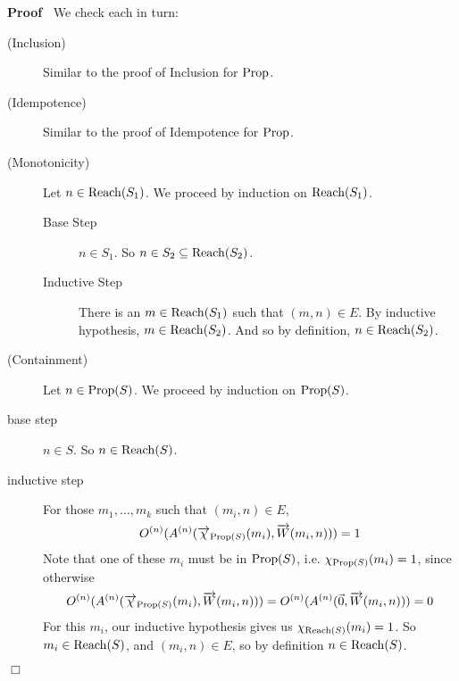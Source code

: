 \documentclass{article}
\newcommand{\tmop}[1]{\ensuremath{\operatorname{#1}}}
\newcommand{\tmtextbf}[1]{\text{{\bfseries{#1}}}}
\newenvironment{proof}{\noindent\textbf{Proof\ }}{\hspace*{\fill}$\Box$\medskip}
\newcommand{\bigchi}{\Large{\chi}}
\newcommand{\Reach}{\textsf{\tmop{Reach}}}
\newcommand{\Prop}{\textsf{\tmop{Prop}}}
\begin{document}
\begin{proof}
  \tmtextbf{(of Proposition \ref{thm:reach-props})} We check each in turn:
  \begin{description}
    \item[(Inclusion)] Similar to the proof of Inclusion for $\Prop$.
    
    \item[(Idempotence)] Similar to the proof of Idempotence for $\Prop$.
    
    \item[(Monotonicity)] Let $n \in \Reach (S_1)$. We proceed by induction on
    $\Reach (S_1)$.
    \begin{description}
      \item[Base Step] $n \in S_1$. So $n \in S_2 \subseteq \Reach (S_2)$.
      
      \item[Inductive Step] There is an $m \in \Reach (S_1)$ such that $(m, n)
      \in E$. By inductive hypothesis, $m \in \Reach (S_2)$. And so by
      definition, $n \in \Reach (S_2)$.
    \end{description}
    \item[(Containment)] Let $n \in \Prop (S)$. We proceed by induction on
    $\Prop (S)$.
    
    \item[base step] $n \in S$. So $n \in \Reach (S)$.
    
    \item[inductive step] For those $m_1, \ldots, m_k$ such that $(m_i, n) \in
    E$,
    \[ O^{(n)} (A^{(n)} (\smash{\overrightarrow{\bigchi}}_{\Prop (S)} (m_i),
       \smash{\overrightarrow{W}} (m_i, n))) = 1 \]
    Note that one of these $m_i$ must be in $\Prop (S)$, i.e.
    $\smash{\bigchi}_{\Prop (S)} (m_i) = 1$, since otherwise
    \[ O^{(n)} (A^{(n)} (\smash{\overrightarrow{\bigchi}}_{\Prop (S)} (m_i),
       \smash{\overrightarrow{W}} (m_i, n))) = O^{(n)} (A^{(n)} (\vec{0},
       \smash{\overrightarrow{W}} (m_i, n))) = 0 \]
    For this $m_i$, our inductive hypothesis gives us $\smash{\bigchi}_{\Reach
    (S)} (m_i) = 1$. So $m_i \in \Reach (S)$, and $(m_i, n) \in E$, so by
    definition $n \in \Reach (S)$.
  \end{description}
\end{proof}
\end{document}
